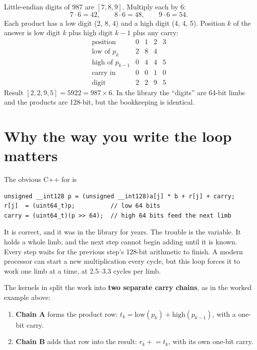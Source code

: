 \begin{example}
Little-endian digits of 987 are $[7, 8, 9]$. Multiply each by 6:
\[
7\cdot 6 = 42,\qquad 8 \cdot 6 = 48,\qquad 9 \cdot 6 = 54 .
\]
Each product has a low digit (2, 8, 4) and a high digit (4, 4, 5). Position $k$ of the
answer is low digit $k$ plus high digit $k-1$ plus any carry:
\[
\begin{array}{c|cccc}
\text{position} & 0 & 1 & 2 & 3\\ \hline
\text{low of } p_k & 2 & 8 & 4 & \\
\text{high of } p_{k-1} & 0 & 4 & 4 & 5\\
\text{carry in} & 0 & 0 & 1 & 0\\ \hline
\text{digit} & 2 & 2 & 9 & 5
\end{array}
\]
Result $[2,2,9,5] = 5922 = 987 \times 6$. In the library the ``digits'' are 64-bit limbs
and the products are 128-bit, but the bookkeeping is identical.
\end{example}

\section{Why the way you write the loop matters}
\label{sec:flagchain}

The obvious C++ for  is

\begin{lstlisting}
unsigned __int128 p = (unsigned __int128)a[j] * b + r[j] + carry;
r[j]  = (uint64_t)p;          // low 64 bits
carry = (uint64_t)(p >> 64);  // high 64 bits feed the next limb
\end{lstlisting}

It is correct, and it was in the library for years. The trouble is the
 variable. It holds a whole limb, and the next step cannot begin adding until
it is known. Every step waits for the previous step's 128-bit arithmetic to finish. A
modern processor can start a new multiplication every cycle, but this loop forces it to
work one limb at a time, at 2.5--3.3 cycles per limb.

The kernels in  split the work into \textbf{two separate carry
chains}, as in the worked example above:

\begin{enumerate}
  \item \textbf{Chain A} forms the product row: $t_k = \text{low}(p_k) + \text{high}(p_{k-1})$,
        with a one-bit carry.
  \item \textbf{Chain B} adds that row into the result: $r_k \mathrel{+}= t_k$, with its own
        one-bit carry.
\end{enumerate}


